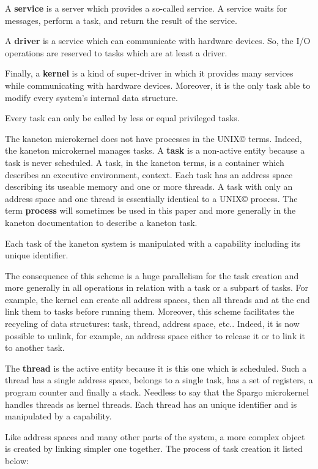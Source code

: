 \documentclass[10pt,a4wide]{article}
\begin{document}
\begin{multicols}{2}
A \textbf{service} is a server which provides a so-called service. A service
waits for messages, perform a task, and return the result of the service.

A \textbf{driver} is a service which can communicate with hardware devices.
So, the I/O operations are reserved to tasks which are at least a driver.

Finally, a \textbf{kernel} is a kind of super-driver in which it provides
many services while communicating with hardware devices. Moreover, it is
the only task able to modify every system's internal data structure.

Every task can only be called by less or equal privileged tasks.

The kaneton microkernel does not have processes in the
UNIX{\scriptsize \copyright} terms. Indeed, the kaneton microkernel manages
tasks. A \textbf{task} is a non-active entity because a task is never scheduled.
A task, in the kaneton terms, is a container which describes an executive
environment, context. Each task has an address space describing its useable
memory and one or more threads. A task with only an address space and one
thread is essentially identical to a UNIX{\scriptsize \copyright} process.
The term \textbf{process} will sometimes be used in this paper and more
generally in the kaneton documentation to describe a kaneton task.

Each task of the kaneton system is manipulated with a capability including
its unique identifier.

The consequence of this scheme is a huge parallelism for the
task creation and more generally in all operations in relation with
a task or a subpart of tasks. For example, the kernel can create all
address spaces, then all threads and at the end link them to tasks before
running them. Moreover, this scheme facilitates the recycling of data
structures: task, thread, address space, etc.. Indeed, it is now possible to
unlink, for example, an address space either to release it or to link it to
another task.

The \textbf{thread} is the active entity because it is this one which is
scheduled. Such a thread has a single address space, belongs to a single
task, has a set of registers, a program counter and finally a stack.
Needless to say that the Spargo microkernel handles threads as kernel threads.
Each thread has an unique identifier and is manipulated by a capability.

Like address spaces and many other parts of the system, a more complex
object is created by linking simpler one together. The process of task creation
it listed below:


\end{multicols}
\end{document}
